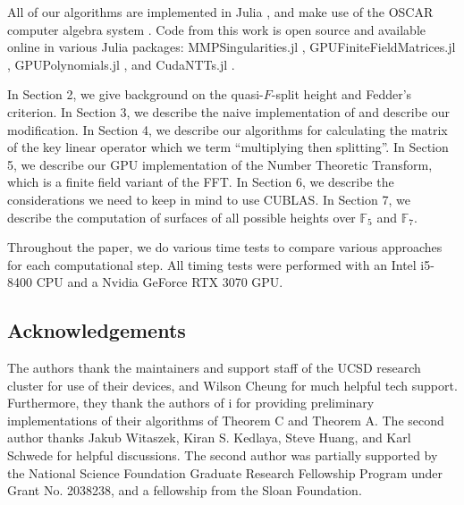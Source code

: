 All of our algorithms are implemented in Julia 
\cite{julia-2017}, and
make use of the OSCAR computer algebra system 
\cite{OSCAR-book}.
Code from this work is open source and available online 
in various
Julia packages: 
MMPSingularities.jl \cite{mmpsingularities-jl},
GPUFiniteFieldMatrices.jl \cite{gpuffmatrices-jl}, 
GPUPolynomials.jl \cite{gpupolynomials-jl},
and CudaNTTs.jl \cite{cudantts-jl}.

In Section 2, we give background on the quasi-\(F\)-split height
and Fedder's criterion.
In Section 3, we describe the naive implementation of
\cite[Theorem~C]{kty-2022-fedder} and describe
our modification.
In Section 4, we describe our algorithms for calculating the matrix
of the key linear operator which we term ``multiplying then splitting''.
In Section 5, we describe our GPU implementation of the Number Theoretic
Transform, which is a finite field variant of the FFT.
In Section 6, we describe the considerations we need to keep in mind
to use CUBLAS.
In Section 7, we describe the computation of surfaces of all possible
heights over \(\mathbb{F}_{5}\) and \(\mathbb{F}_{7}\).

Throughout the paper, we do various time tests to compare various
approaches for each computational step.
All timing tests were performed with 
an Intel i5-8400 CPU and a Nvidia GeForce RTX 3070 GPU.

\subsection{Acknowledgements}

The authors thank the maintainers and support staff 
of the UCSD research cluster for use of their devices,
and Wilson Cheung for much helpful tech support.
Furthermore, they thank the authors of 
\cite{kty-2022-fedder} 
i%
for providing preliminary implementations of 
their algorithms of
Theorem C and Theorem A.
The second author thanks Jakub Witaszek, Kiran S. Kedlaya,
Steve Huang, and Karl Schwede for helpful discussions.
The second author was partially supported by the 
National Science Foundation Graduate Research
Fellowship Program under Grant No. 2038238, and a fellowship
from the Sloan Foundation.

